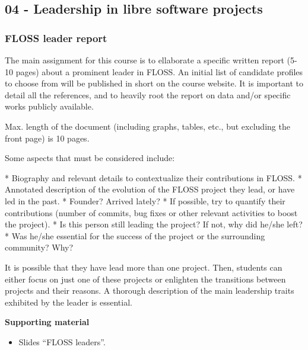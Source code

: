\documentclass[a4paper]{article}
\begin{document}
\subsection{04 - Leadership in libre software projects}


\subsubsection{FLOSS leader report}
\label{sub:floss-leaders}

The main assignment for this course is to ellaborate a specific written report (5-10 pages) about a prominent leader in FLOSS. An initial list of 
candidate profiles to choose from will be published in short on the course website. It is important to detail all the references, and to heavily root 
the report on data and/or specific works publicly available.

Max. length of the document (including graphs, tables, etc., but excluding the front page) is 10 pages.

Some aspects that must be considered include:

    * Biography and relevant details to contextualize their contributions in FLOSS.
    * Annotated description of the evolution of the FLOSS project they lead, or have led in the past.
    * Founder? Arrived lately?
    * If possible, try to quantify their contributions (number of commits, bug fixes or other relevant activities to boost the project).
    * Is this person still leading the project? If not, why did he/she left?
    * Was he/she essential for the success of the project or the surrounding community? Why?

It is possible that they have lead more than one project. Then, students can either focus on just one of these projects or enlighten the transitions between 
projects and their reasons. A thorough description of the main leadership traits exhibited by the leader is essential.

\textbf{Supporting material}

\begin{itemize}
\item Slides ``FLOSS leaders''.
\end{itemize}

\end{document}
